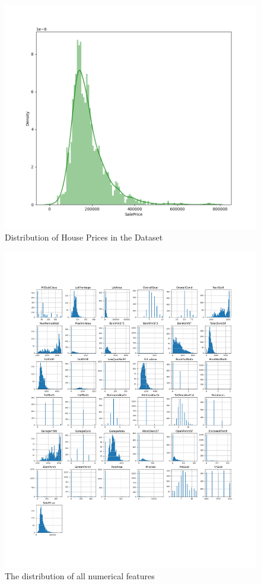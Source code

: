 \documentclass{article}
\begin{document}
\begin{figure}
    \centering
    \includegraphics[width=1\linewidth]{sale_price_distribution.png}
    \caption{Distribution of House Prices in the Dataset}
    \label{price_density}
    
\end{figure}
\begin{figure}
    \centering
    \includegraphics[width=1\linewidth]{dis_numerical_fueatures.png}
    \caption{The distribution of all numerical features}
    \label{Dis_num}
\end{figure}
\end{document}
